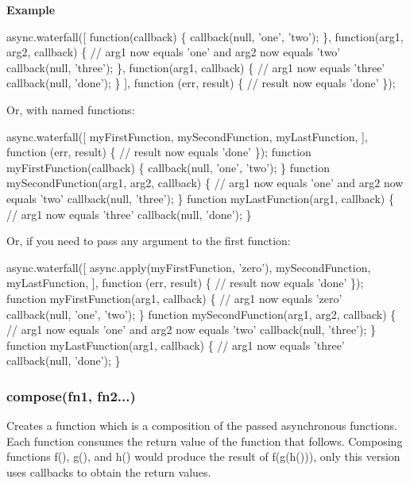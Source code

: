 {\bfseries Example}


\begin{DoxyCode}
async.waterfall([
    function(callback) \{
        callback(null, 'one', 'two');
    \},
    function(arg1, arg2, callback) \{
      // arg1 now equals 'one' and arg2 now equals 'two'
        callback(null, 'three');
    \},
    function(arg1, callback) \{
        // arg1 now equals 'three'
        callback(null, 'done');
    \}
], function (err, result) \{
    // result now equals 'done'
\});
\end{DoxyCode}
 Or, with named functions\+:


\begin{DoxyCode}
async.waterfall([
    myFirstFunction,
    mySecondFunction,
    myLastFunction,
], function (err, result) \{
    // result now equals 'done'
\});
function myFirstFunction(callback) \{
  callback(null, 'one', 'two');
\}
function mySecondFunction(arg1, arg2, callback) \{
  // arg1 now equals 'one' and arg2 now equals 'two'
  callback(null, 'three');
\}
function myLastFunction(arg1, callback) \{
  // arg1 now equals 'three'
  callback(null, 'done');
\}
\end{DoxyCode}


Or, if you need to pass any argument to the first function\+:


\begin{DoxyCode}
async.waterfall([
    async.apply(myFirstFunction, 'zero'),
    mySecondFunction,
    myLastFunction,
], function (err, result) \{
    // result now equals 'done'
\});
function myFirstFunction(arg1, callback) \{
  // arg1 now equals 'zero'
  callback(null, 'one', 'two');
\}
function mySecondFunction(arg1, arg2, callback) \{
  // arg1 now equals 'one' and arg2 now equals 'two'
  callback(null, 'three');
\}
function myLastFunction(arg1, callback) \{
  // arg1 now equals 'three'
  callback(null, 'done');
\}
\end{DoxyCode}
 

 \label{_compose}%
 \subsubsection*{compose(fn1, fn2...)}

Creates a function which is a composition of the passed asynchronous functions. Each function consumes the return value of the function that follows. Composing functions {\ttfamily f()}, {\ttfamily g()}, and {\ttfamily h()} would produce the result of {\ttfamily f(g(h()))}, only this version uses callbacks to obtain the return values.

